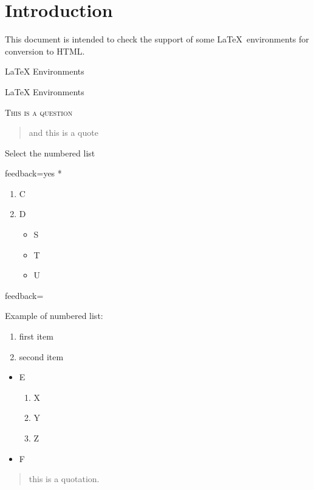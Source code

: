 \documentclass{article}
\begin{document}
\section*{Introduction}

This document is intended to check the support of some \LaTeX\ environments for 
conversion to HTML.

\begin{quiz}[points=1]{LaTeX Environments}
\begin{multi}{LaTeX Environments}
\begin{center}
\textsc{This is a question}
\end{center}
\begin{quote}
and this is a quote
\end{quote}

Select the numbered list
\item[feedback={yes}]* \begin{enumerate}
         \item C
         \item D
         \begin{itemize}
           \item S
           \item T
           \item U
          \end{itemize}  
       \end{enumerate}
\item[feedback={Example of numbered list:\\\begin{enumerate}
\item first item
\item second item
\end{enumerate}
}] \begin{itemize}
         \item E
         \begin{enumerate}
         \item X
         \item Y
         \item Z
         \end{enumerate}
         \item F
      \end{itemize}
\item \begin{quotation}
this is a quotation.
\end{quotation}
\end{multi}
\end{quiz}
\end{document}
